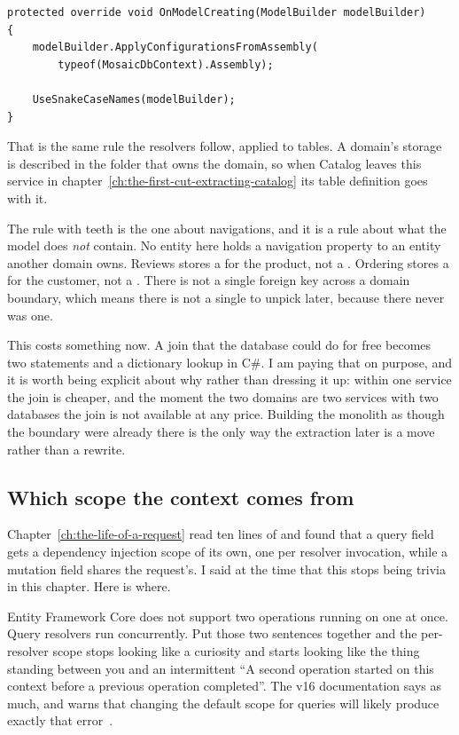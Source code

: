 \begin{verbatim}
protected override void OnModelCreating(ModelBuilder modelBuilder)
{
    modelBuilder.ApplyConfigurationsFromAssembly(
        typeof(MosaicDbContext).Assembly);

    UseSnakeCaseNames(modelBuilder);
}
\end{verbatim}

That is the same rule the resolvers follow, applied to tables. A domain's
storage is described in the folder that owns the domain, so when Catalog leaves
this service in chapter~\ref{ch:the-first-cut-extracting-catalog} its table
definition goes with it.

%
The rule with teeth is the one about navigations, and it is a rule about what
the model does \emph{not} contain. No entity here holds a navigation property to
an entity another domain owns. Reviews stores a  for the product, not
a . Ordering stores a  for the customer, not a
. There is not a single foreign key across a domain boundary,
which means there is not a single  to unpick later, because there
never was one.

This costs something now. A join that the database could do for free becomes two
statements and a dictionary lookup in C\#. I am paying that on purpose, and it is
worth being explicit about why rather than dressing it up: within one service the
join is cheaper, and the moment the two domains are two services with two
databases the join is not available at any price. Building the monolith as though
the boundary were already there is the only way the extraction later is a move
rather than a rewrite.

\subsection*{Which scope the context comes from}

%
Chapter~\ref{ch:the-life-of-a-request} read ten lines of  and
found that a query field gets a dependency injection scope of its own, one per
resolver invocation, while a mutation field shares the request's. I said at the
time that this stops being trivia in this chapter. Here is where.

%
Entity Framework Core does not support two operations running on one
 at once. Query resolvers run concurrently. Put those two
sentences together and the per-resolver scope stops looking like a curiosity and
starts looking like the thing standing between you and an intermittent
\enquote{A second operation started on this context before a previous operation
completed}. The v16 documentation says as much, and warns that changing the
default scope for queries will likely produce exactly that
error~\autocite{chillicream2026efcore}.

